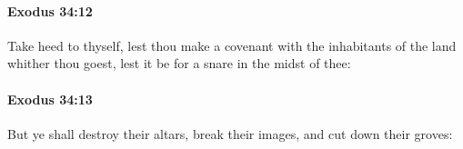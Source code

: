 		\paragraph{Exodus 34:12} %
			\label{EXODUS-34-12}

			Take heed to thyself, lest thou make a covenant with the inhabitants of the land whither thou goest, lest it be for a snare in the midst of thee:


		\paragraph{Exodus 34:13} %
			\label{EXODUS-34-13}

			But ye shall destroy their altars, break their images, and cut down their groves:


